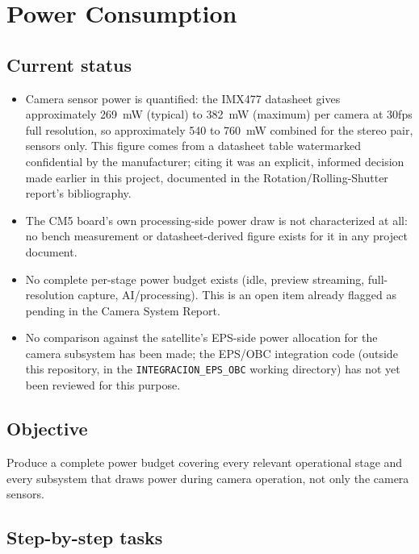 \chapter{Power Consumption}
\label{chap:power-consumption}

\section{Current status}

\begin{itemize}
    \item Camera sensor power is quantified: the IMX477 datasheet gives approximately 269~mW (typical) to 382~mW (maximum) per camera at 30fps full resolution, so approximately 540 to 760~mW combined for the stereo pair, sensors only. This figure comes from a datasheet table watermarked confidential by the manufacturer; citing it was an explicit, informed decision made earlier in this project, documented in the Rotation/Rolling-Shutter report's bibliography.
    \item The CM5 board's own processing-side power draw is not characterized at all: no bench measurement or datasheet-derived figure exists for it in any project document.
    \item No complete per-stage power budget exists (idle, preview streaming, full-resolution capture, AI/processing). This is an open item already flagged as pending in the Camera System Report.
    \item No comparison against the satellite's EPS-side power allocation for the camera subsystem has been made; the EPS/OBC integration code (outside this repository, in the \texttt{INTEGRACION\_EPS\_OBC} working directory) has not yet been reviewed for this purpose.
\end{itemize}

\section{Objective}

Produce a complete power budget covering every relevant operational stage and every subsystem that draws power during camera operation, not only the camera sensors.

\section{Step-by-step tasks}

